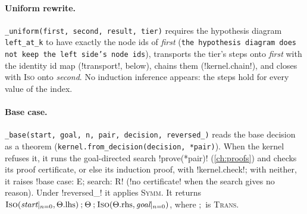 \paragraph{Uniform rewrite.} \texttt{\_\allowbreak{}uniform(\allowbreak{}first,\allowbreak{} second,\allowbreak{} result,\allowbreak{} tier)} requires the hypothesis diagram \texttt{left\_at\_k} to have exactly the node ids of \textit{first} (\texttt{the hypothesis diagram does not keep the left side's node ids}), transports the tier's steps onto \textit{first} with the identity id map (\py!transport!, below), chains them (\py!kernel.chain!), and closes with \textsc{Iso} onto \textit{second}. No induction inference appears: the steps hold for every value of the index.

\paragraph{Base case.} \texttt{\_\allowbreak{}base(\allowbreak{}start,\allowbreak{} goal,\allowbreak{} n,\allowbreak{} pair,\allowbreak{} decision,\allowbreak{} reversed\_\allowbreak{})} reads the base decision as a theorem (\texttt{kernel.\allowbreak{}from\_\allowbreak{}decision(\allowbreak{}decision,\allowbreak{} *pair)}). When the kernel refuses it, it runs the goal-directed search \py!prove(*pair)! (\cref{ch:proofs}) and checks its proof certificate, or else its induction proof, with \py!kernel.check!; with neither, it raises \code!base case: E; search: R! (\code!no certificate! when the search gives no reason). Under \code!reversed_! it applies \textsc{Symm}. It returns $\textsc{Iso}(\textit{start}|_{n=0}, \Theta.\mathrm{lhs})\mathbin{;}\Theta\mathbin{;}\textsc{Iso}(\Theta.\mathrm{rhs}, \textit{goal}|_{n=0})$, where $;$ is \textsc{Trans}.

